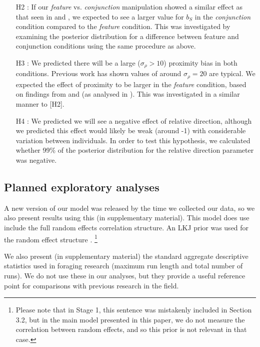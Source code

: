 \documentclass[12pt]{article}
\begin{document}
\begin{enumerate}
    \item [H2]: If our \textit{feature} vs. \textit{conjunction} manipulation showed a similar effect as that seen in \citep{kristjansson2014common} and \citep{clarke2022stable}, we expected to see a larger value for $b_S$ in the \textit{conjunction} condition compared to the \textit{feature} condition. This was investigated by examining the posterior distribution for a difference between feature and conjunction conditions using the same procedure as above.
    \item [H3]: We predicted there will be a large ($\sigma_{\rho}>10$) proximity bias in both conditions. Previous work has shown values of around $\sigma_{\rho}=20$ are typical. We expected the effect of proximity to be larger in the \textit{feature} condition, based on findings from \citep{kristjansson2014common} and \citep{clarke2022stable} (as analysed in \citep{clarke2022foraging}). This was investigated in a similar manner to [H2].
    \item [H4]: We predicted we will see a negative effect of relative direction, although we predicted this effect would likely be weak (around -1) with considerable variation between individuals. In order to test this hypothesis, we calculated whether 99\% of the posterior distribution for the relative direction parameter was negative.
\end{enumerate}

\subsection{Planned exploratory analyses}

A new version of our model was released by the time we collected our data, so we also present results using this (in supplementary material). This model does use include the full random effects correlation structure. An LKJ prior was used for the random effect structure \citep{LEWANDOWSKI20091989}. \footnote{Please note that in Stage 1, this sentence was mistakenly included in Section 3.2, but in the main model presented in this paper, we do not measure the correlation between random effects, and so this prior is not relevant in that case.}

We also present (in supplementary material) the standard aggregate descriptive statistics used in foraging research (maximum run length and total number of runs). We do not use these in our analyses, but they provide a useful reference point for comparisons with previous research in the field.
\end{document}
